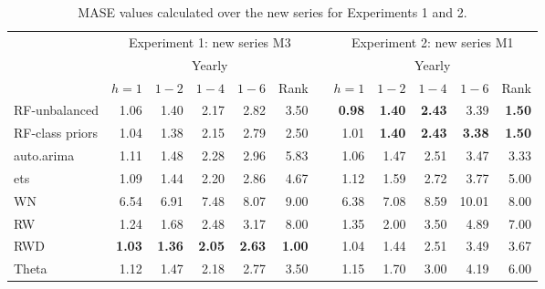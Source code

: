 \documentclass[11pt,a4paper,]{article}
\begin{document}
\begin{table}[!htbp]
\centering\footnotesize
\centering
\caption{MASE values calculated over the new series for Experiments 1 and 2.}
\label{masetab}
\begin{tabular}{lrrrrrrrrrrr}
\toprule
                     &                              \multicolumn{ 5}{c}{Experiment 1: new series M3} &            &                              \multicolumn{ 5}{c}{Experiment 2: new series M1} \\\cmidrule(lr){2-6} \cmidrule(lr){8-12}
                     &                                    \multicolumn{ 5}{c}{Yearly} &            &                                    \multicolumn{ 5}{c}{Yearly} \\
                     &   $h=1$    &    $1-2$   &     $1-4$  &     $1-6$  &      Rank  &            &     $h=1$  &    $1-2$   &     $1-4$  &     $1-6$  &   Rank \\\cmidrule(lr){2-6} \cmidrule(lr){8-12}
RF-unbalanced        &       1.06 &       1.40 &       2.17 &       2.82 &       3.50 &            & {\bf 0.98} & {\bf 1.40} &       {\bf 2.43} &       3.39 &        {\bf 1.50} \\
RF-class priors      & 1.04 &       1.38 &       2.15 &       2.79 &       2.50 &            &       1.01 &       {\bf 1.40} & {\bf 2.43} & {\bf 3.38} & {\bf 1.50} \\
auto.arima           &       1.11 &       1.48 &       2.28 &       2.96 &       5.83 &            &       1.06 &       1.47 &       2.51 &       3.47 &       3.33 \\
ets                  &       1.09 &       1.44 &       2.20 &       2.86 &       4.67 &            &       1.12 &       1.59 &       2.72 &       3.77 &       5.00 \\
WN                   &       6.54 &       6.91 &       7.48 &       8.07 &       9.00 &            &       6.38 &       7.08 &       8.59 &      10.01 &       8.00 \\
RW                   &       1.24 &       1.68 &       2.48 &       3.17 &       8.00 &            &       1.35 &       2.00 &       3.50 &       4.89 &       7.00 \\
RWD                  & {\bf 1.03} & {\bf 1.36} & {\bf 2.05} & {\bf 2.63} & {\bf 1.00} &            &       1.04 &       1.44 &       2.51 &       3.49 &       3.67 \\
Theta                &       1.12 &       1.47 &       2.18 &       2.77 &       3.50 &            &       1.15 &       1.70 &       3.00 &       4.19 &       6.00 \\\cmidrule(lr){2-6} \cmidrule(lr){8-12}

\end{tabular}
\end{table}
\end{document}
